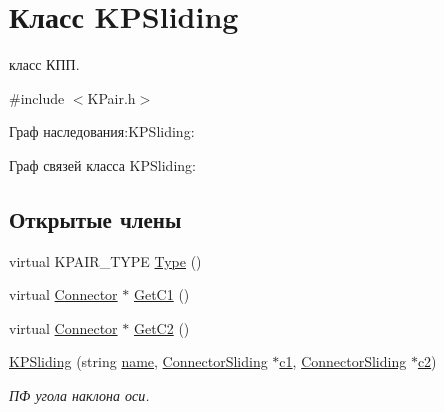 \hypertarget{class_k_p_sliding}{
\section{Класс KPSliding}
\label{class_k_p_sliding}
}


класс КПП.  




{\ttfamily \#include $<$KPair.h$>$}



Граф наследования:KPSliding:


Граф связей класса KPSliding:
\subsection*{Открытые члены}
\begin{DoxyCompactItemize}
\item 
virtual KPAIR\_\-TYPE \hyperlink{class_k_p_sliding_abc8a7db0983bf9b9b5c525ab5682b531}{Type} ()
\item 
virtual \hyperlink{struct_connector}{Connector} $\ast$ \hyperlink{class_k_p_sliding_a45568125f197b4d80047760b69e46bbe}{GetC1} ()
\item 
virtual \hyperlink{struct_connector}{Connector} $\ast$ \hyperlink{class_k_p_sliding_a249d6c9c05c78ed47e5a3ef2a133a3e9}{GetC2} ()
\item 
\hyperlink{class_k_p_sliding_a3e8f5e46618137ee3b45249bebcea51a}{KPSliding} (string \hyperlink{class_k_pair_ae2868cc85dce1139586a5a60eab22400}{name}, \hyperlink{struct_connector_sliding}{ConnectorSliding} $\ast$\hyperlink{class_k_p_sliding_ad6bc7cae8c3b668341911454f17c9a0d}{c1}, \hyperlink{struct_connector_sliding}{ConnectorSliding} $\ast$\hyperlink{class_k_p_sliding_a6f65155b81a19bc4e21a3dd4dee6e6db}{c2})
\begin{DoxyCompactList}\small\item\em ПФ угола наклона оси. \item\end{DoxyCompactList}\end{DoxyCompactItemize}
